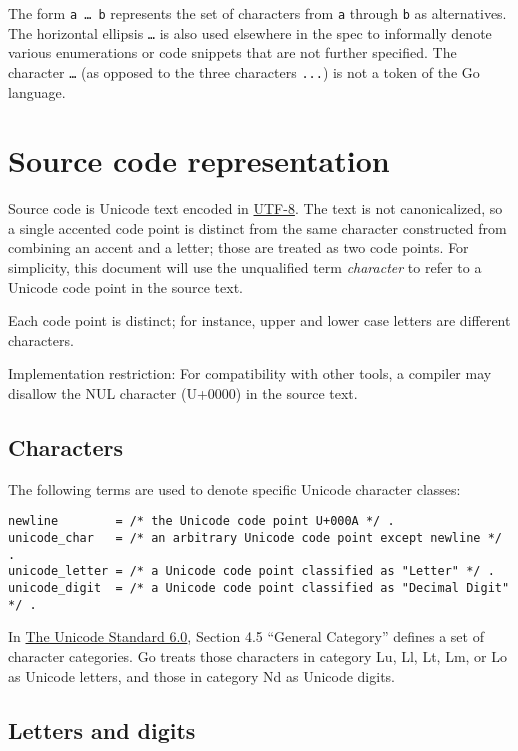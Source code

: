 The form \texttt{a \ldots{} b} represents the set of characters from
\texttt{a} through \texttt{b} as alternatives. The horizontal ellipsis
\texttt{\ldots{}} is also used elsewhere in the spec to informally
denote various enumerations or code snippets that are not further
specified. The character \texttt{\ldots{}} (as opposed to the three
characters \texttt{...}) is not a token of the Go language.

\section*{Source code representation}

Source code is Unicode text encoded in
\href{http://en.wikipedia.org/wiki/UTF-8}{UTF-8}. The text is not
canonicalized, so a single accented code point is distinct from the same
character constructed from combining an accent and a letter; those are
treated as two code points. For simplicity, this document will use the
unqualified term \emph{character} to refer to a Unicode code point in
the source text.

Each code point is distinct; for instance, upper and lower case letters
are different characters.

Implementation restriction: For compatibility with other tools, a
compiler may disallow the NUL character (U+0000) in the source text.

\subsection*{Characters}

The following terms are used to denote specific Unicode character
classes:

\begin{Verbatim}[frame=single]
newline        = /* the Unicode code point U+000A */ .
unicode_char   = /* an arbitrary Unicode code point except newline */ .
unicode_letter = /* a Unicode code point classified as "Letter" */ .
unicode_digit  = /* a Unicode code point classified as "Decimal Digit" */ .
\end{Verbatim}

In \href{http://www.unicode.org/versions/Unicode6.0.0/}{The Unicode
Standard 6.0}, Section 4.5 ``General Category'' defines a set of
character categories. Go treats those characters in category Lu, Ll, Lt,
Lm, or Lo as Unicode letters, and those in category Nd as Unicode
digits.

\subsection*{Letters and digits}

